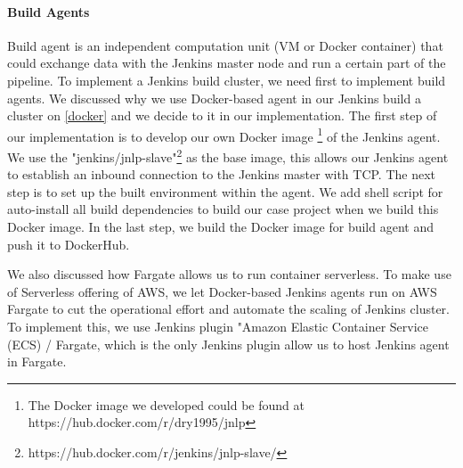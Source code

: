 \paragraph[]{Build Agents}
Build agent is an independent computation unit (VM or Docker container) that could exchange data with the Jenkins master node and run a certain part of the pipeline. To implement a Jenkins build cluster, we need first to implement build agents.
We discussed why we use Docker-based agent in our Jenkins build a cluster on \ref{docker} and we decide to it in our implementation. The first step of our implementation is to develop our own Docker image \footnote{The Docker image we developed could be found at https://hub.docker.com/r/dry1995/jnlp} of the Jenkins agent. We use the "jenkins/jnlp-slave"\footnote{https://hub.docker.com/r/jenkins/jnlp-slave/} as the base image, this allows our Jenkins agent to establish an inbound connection to the Jenkins master with TCP. The next step is to set up the built environment within the agent. We add shell script for auto-install all build dependencies to build our case project when we build this Docker image. In the last step, we build the Docker image for build agent and push it to DockerHub. 
\par
We also discussed how Fargate allows us to run container serverless. To make use of Serverless offering of AWS, we let Docker-based Jenkins agents run on AWS Fargate to cut the operational effort and automate the scaling of Jenkins cluster. To implement this, we use Jenkins plugin "Amazon Elastic Container Service (ECS) / Fargate, which is the only Jenkins plugin allow us to host Jenkins agent in Fargate.  

